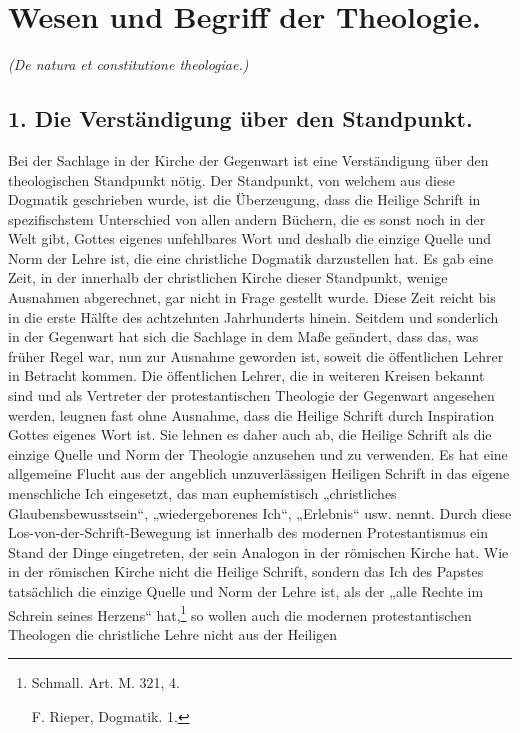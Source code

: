 \section*{Wesen und Begriff der Theologie.}
\emph{(De natura et constitutione theologiae.)}

\subsection*{1. Die Verständigung über den Standpunkt.}

Bei der Sachlage in der Kirche der Gegenwart ist eine Verständigung über den theologischen Standpunkt nötig. Der Standpunkt, von welchem aus diese Dogmatik geschrieben wurde, ist die Überzeugung, dass die Heilige Schrift in spezifischstem Unterschied von allen andern Büchern, die es sonst noch in der Welt gibt, Gottes eigenes unfehlbares Wort und deshalb die einzige Quelle und Norm der Lehre ist, die eine christliche Dogmatik darzustellen hat. Es gab eine Zeit, in der innerhalb der christlichen Kirche dieser Standpunkt, wenige Ausnahmen abgerechnet, gar nicht in Frage gestellt wurde. Diese Zeit reicht bis in die erste Hälfte des achtzehnten Jahrhunderts hinein. Seitdem und sonderlich in der Gegenwart hat sich die Sachlage in dem Maße geändert, dass das, was früher Regel war, nun zur Ausnahme geworden ist, soweit die öffentlichen Lehrer in Betracht kommen. Die öffentlichen Lehrer, die in weiteren Kreisen bekannt sind und als Vertreter der protestantischen Theologie der Gegenwart angesehen werden, leugnen fast ohne Ausnahme, dass die Heilige Schrift durch Inspiration Gottes eigenes Wort ist. Sie lehnen es daher auch ab, die Heilige Schrift als die einzige Quelle und Norm der Theologie anzusehen und zu verwenden. Es hat eine allgemeine Flucht aus der angeblich unzuverlässigen Heiligen Schrift in das eigene menschliche Ich eingesetzt, das man euphemistisch „christliches Glaubensbewusstsein“, „wiedergeborenes Ich“, „Erlebnis“ usw. nennt. Durch diese Los-von-der-Schrift-Bewegung ist innerhalb des modernen Protestantismus ein Stand der Dinge eingetreten, der sein Analogon in der römischen Kirche hat. Wie in der römischen Kirche nicht die Heilige Schrift, sondern das Ich des Papstes tatsächlich die einzige Quelle und Norm der Lehre ist, als der „alle Rechte im Schrein seines Herzens“ hat,\footnote{Schmall. Art. M. 321, 4.\par F. Rieper, Dogmatik. 1.} so wollen auch die modernen protestantischen Theologen die christliche Lehre nicht aus der Heiligen